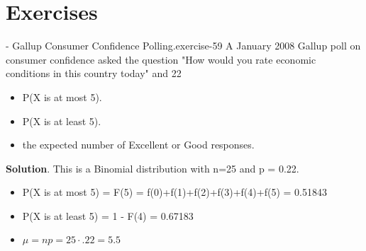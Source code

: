 \documentclass[10pt,]{book}
\numberwithin{equation}{section}
\begin{document}
\section[{Exercises}]{Exercises}\label{section-50}
\hypertarget{p-924}{}%
\begin{inlineexercise}{- Gallup Consumer Confidence Polling.}{exercise-59}%
\hypertarget{p-925}{}%
A January 2008 Gallup poll on consumer confidence asked the question "How would you rate economic conditions in this country today" and 22%
\begin{itemize}[label=\textbullet]
\item{}P(X is at most 5).%
\item{}P(X is at least 5).%
\item{}the expected number of Excellent or Good responses.%
\end{itemize}
%
\textbf{Solution}.\quad%
\hypertarget{p-926}{}%
This is a Binomial distribution with n=25 and p = 0.22. \leavevmode%
\begin{itemize}[label=\textbullet]
\item{}P(X is at most 5) = F(5) = f(0)+f(1)+f(2)+f(3)+f(4)+f(5) = 0.51843%
\item{}P(X is at least 5) = 1 - F(4) = 0.67183%
\item{}\(\mu = np = 25 \cdot .22 = 5.5\)%
\end{itemize}
%
\end{inlineexercise}
%
\par
\hypertarget{p-927}{}%
\end{document}
